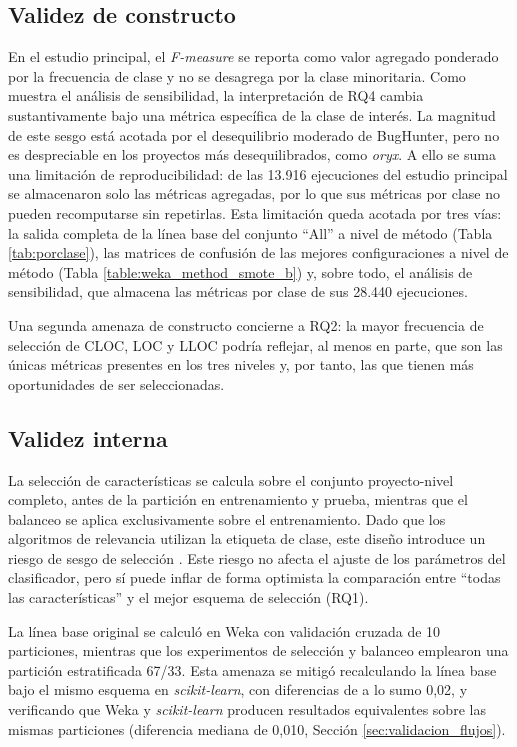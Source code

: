\subsection{Validez de constructo}

En el estudio principal, el \textit{F-measure} se reporta como valor agregado ponderado por la frecuencia de clase y no se desagrega por la clase minoritaria. Como muestra el análisis de sensibilidad, la interpretación de RQ4 cambia sustantivamente bajo una métrica específica de la clase de interés. La magnitud de este sesgo está acotada por el desequilibrio moderado de BugHunter, pero no es despreciable en los proyectos más desequilibrados, como \textit{oryx}. A ello se suma una limitación de reproducibilidad: de las 13.916 ejecuciones del estudio principal se almacenaron solo las métricas agregadas, por lo que sus métricas por clase no pueden recomputarse sin repetirlas. Esta limitación queda acotada por tres vías: la salida completa de la línea base del conjunto ``All'' a nivel de método (Tabla \ref{tab:porclase}), las matrices de confusión de las mejores configuraciones a nivel de método (Tabla \ref{table:weka_method_smote_b}) y, sobre todo, el análisis de sensibilidad, que almacena las métricas por clase de sus 28.440 ejecuciones.

Una segunda amenaza de constructo concierne a RQ2: la mayor frecuencia de selección de CLOC, LOC y LLOC podría reflejar, al menos en parte, que son las únicas métricas presentes en los tres niveles y, por tanto, las que tienen más oportunidades de ser seleccionadas.

\subsection{Validez interna}

La selección de características se calcula sobre el conjunto proyecto-nivel completo, antes de la partición en entrenamiento y prueba, mientras que el balanceo se aplica exclusivamente sobre el entrenamiento. Dado que los algoritmos de relevancia utilizan la etiqueta de clase, este diseño introduce un riesgo de sesgo de selección \cite{ambroise2002,cawley2010}. Este riesgo no afecta el ajuste de los parámetros del clasificador, pero sí puede inflar de forma optimista la comparación entre ``todas las características'' y el mejor esquema de selección (RQ1).

La línea base original se calculó en Weka con validación cruzada de 10 particiones, mientras que los experimentos de selección y balanceo emplearon una partición estratificada 67/33. Esta amenaza se mitigó recalculando la línea base bajo el mismo esquema en \textit{scikit-learn}, con diferencias de a lo sumo 0,02, y verificando que Weka y \textit{scikit-learn} producen resultados equivalentes sobre las mismas particiones (diferencia mediana de 0,010, Sección \ref{sec:validacion_flujos}).

